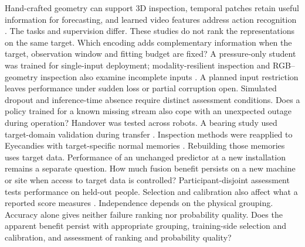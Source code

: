   {Hand-crafted geometry can support 3D inspection, temporal patches retain useful
   information for forecasting, and learned video features address action recognition
   .
   The tasks and supervision differ. These studies do not rank the representations
   on the same target.}
  {Which encoding adds complementary information when the target, observation window and fitting budget are fixed?}
  {A pressure-only student was trained for single-input deployment; modality-resilient
   inspection and RGB--geometry inspection also examine incomplete inputs
   .
   A planned input restriction leaves performance under sudden loss or partial
   corruption open. Simulated dropout and inference-time absence require distinct
   assessment conditions.}
  {Does a policy trained for a known missing stream also cope with an unexpected outage during operation?}
  {Handover was tested across robots. A bearing study used target-domain validation during transfer
   .
   Inspection methods were reapplied to Eyecandies with target-specific normal memories
   .
   Rebuilding those memories uses target data. Performance of an unchanged predictor
   at a new installation remains a separate question.}
  {How much fusion benefit persists on a new machine or site when access to target data is controlled?}
  {Participant-disjoint assessment tests performance on held-out people. Selection
   and calibration also affect what a reported score measures
   .
   Independence depends on the physical grouping. Accuracy alone gives neither
   failure ranking nor probability quality.}
  {Does the apparent benefit persist with appropriate grouping, training-side selection
   and calibration, and assessment of ranking and probability quality?}
\newcommand{\ReviewTableRow}[6]{%
  \textbf{#2} &
  \csname ReviewFinding#1\endcsname & \csname ReviewQuestion#1\endcsname\tabularnewline
  \addlinespace[.45em]}

